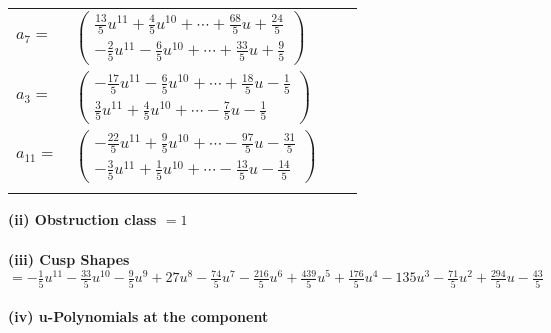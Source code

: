 \documentclass[1p]{elsarticle_modified}
\theoremstyle{definition}
\begin{document}
\begin{tabular}{m{7pt} m{180pt} m{7pt} m{180pt} }
\flushright $a_{7}=$&$\begin{pmatrix}\frac{13}{5} u^{11}+\frac{4}{5} u^{10}+\cdots+\frac{68}{5} u+\frac{24}{5}\\-\frac{2}{5} u^{11}-\frac{6}{5} u^{10}+\cdots+\frac{33}{5} u+\frac{9}{5}\end{pmatrix}$ \\
\flushright $a_{3}=$&$\begin{pmatrix}-\frac{17}{5} u^{11}-\frac{6}{5} u^{10}+\cdots+\frac{18}{5} u-\frac{1}{5}\\\frac{3}{5} u^{11}+\frac{4}{5} u^{10}+\cdots-\frac{7}{5} u-\frac{1}{5}\end{pmatrix}$ \\
\flushright $a_{11}=$&$\begin{pmatrix}-\frac{22}{5} u^{11}+\frac{9}{5} u^{10}+\cdots-\frac{97}{5} u-\frac{31}{5}\\-\frac{3}{5} u^{11}+\frac{1}{5} u^{10}+\cdots-\frac{13}{5} u-\frac{14}{5}\end{pmatrix}$\\&\end{tabular}
\flushleft \textbf{(ii) Obstruction class $= 1$}\\~\\
\flushleft \textbf{(iii) Cusp Shapes $= -\frac{1}{5} u^{11}-\frac{33}{5} u^{10}-\frac{9}{5} u^9+27 u^8-\frac{74}{5} u^7-\frac{216}{5} u^6+\frac{439}{5} u^5+\frac{176}{5} u^4-135 u^3-\frac{71}{5} u^2+\frac{294}{5} u-\frac{43}{5}$}\\~\\
\newpage\renewcommand{\arraystretch}{1}
\flushleft \textbf{(iv) u-Polynomials at the component}\newline \\
\end{document}
